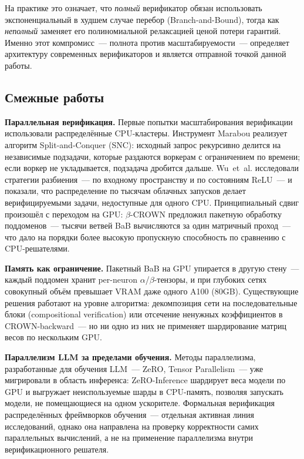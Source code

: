На практике это означает, что \emph{полный} верификатор обязан использовать
экспоненциальный в худшем случае перебор (Branch-and-Bound), тогда как
\emph{неполный} заменяет его полиномиальной релаксацией ценой потери гарантий.
Именно этот компромисс~--- полнота против масштабируемости~--- определяет
архитектуру современных верификаторов и является отправной точкой данной работы.

\subsection*{Смежные работы}

\textbf{Параллельная верификация.}
Первые попытки масштабирования верификации использовали распределённые
CPU-кластеры.
Инструмент Marabou\cite{arXiv2401Marabou2} реализует алгоритм
Split-and-Conquer (SNC): исходный запрос рекурсивно делится на независимые
подзадачи, которые раздаются воркерам с ограничением по времени;
если воркер не укладывается, подзадача дробится дальше.
Wu~et~al.\cite{WuParallelVerification2020} исследовали стратегии разбиения~---
по входному пространству и по состояниям ReLU~--- и показали, что
распределение по тысячам облачных запусков делает верифицируемыми задачи,
недоступные для одного CPU.
Принципиальный сдвиг произошёл с переходом на GPU: $\beta$-CROWN\cite{betaCROWN2021}
предложил пакетную обработку поддоменов~--- тысячи ветвей BaB вычисляются
за один матричный проход~--- что дало на порядки более высокую пропускную
способность по сравнению с CPU-решателями.

\textbf{Память как ограничение.}
Пакетный BaB на GPU упирается в другую стену~---
каждый поддомен хранит per-neuron $\alpha$/$\beta$-тензоры, и при глубоких
сетях совокупный объём превышает VRAM даже одного A100 (80GB).
Существующие решения работают на уровне алгоритма: декомпозиция сети
на последовательные блоки (compositional verification) или отсечение
ненужных коэффициентов в CROWN-backward~--- но ни одно из них не применяет
шардирование матриц весов по нескольким GPU.

\textbf{Параллелизм LLM за пределами обучения.}
Методы параллелизма, разработанные для обучения LLM~---
ZeRO\cite{ZeROPaper}, Tensor Parallelism\cite{MegatronLM2020}~---
уже мигрировали в область инференса: ZeRO-Inference\cite{RajbhandariZeROInference2022}
шардирует веса модели по GPU и выгружает неиспользуемые шарды в CPU-память,
позволяя запускать модели, не помещающиеся на одном ускорителе.
Формальная верификация распределённых фреймворков обучения~--- отдельная
активная линия исследований, однако она направлена на проверку корректности
самих параллельных вычислений, а не на применение параллелизма внутри
верификационного решателя.

